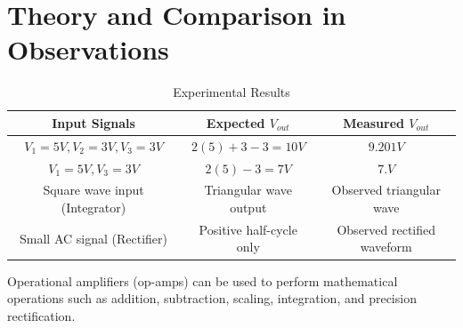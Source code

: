 \documentclass[a4paper,12pt]{article}
\begin{document}
\section{Theory and Comparison in Observations}
\begin{table}[H]
    \centering
    \begin{tabular}{|c|c|c|}
        \hline
        \textbf{Input Signals} & \textbf{Expected \( V_{out} \)} & \textbf{Measured \( V_{out} \)} \\
        \hline
        \( V_1 = 5V, V_2 = 3V, V_3 = 3V \) & \( 2(5) + 3 - 3 = 10V \) & \( 9.201V \) \\
        \hline
        \( V_1 = 5V, V_3 = 3V \) & \( 2(5) - 3 = 7V \) & \( 7.V \) \\
        \hline
        Square wave input (Integrator) & Triangular wave output & Observed triangular wave \\
        \hline
        Small AC signal (Rectifier) & Positive half-cycle only & Observed rectified waveform \\
        \hline
    \end{tabular}
    \caption{Experimental Results}
    \label{tab:results}
\end{table}

Operational amplifiers (op-amps) can be used to perform mathematical operations such as addition, subtraction, scaling, integration, and precision rectification.
\end{document}
